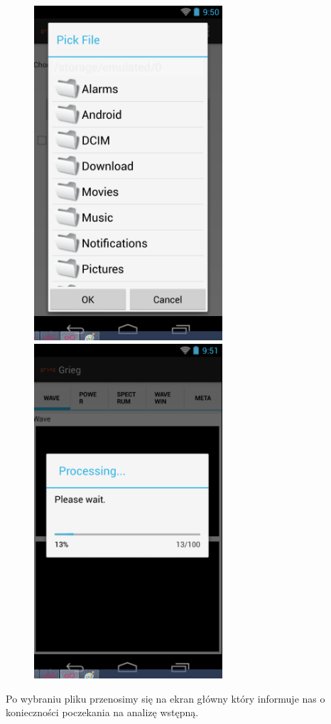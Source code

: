 \begin{figure}[H]
  \centering
  \includegraphics[width=7cm]{images/Pick_file}
  \includegraphics[width=7cm]{images/Processing}
\end{figure}

Po wybraniu pliku przenosimy się na ekran główny który informuje nas o konieczności poczekania na
analizę wstępną.

